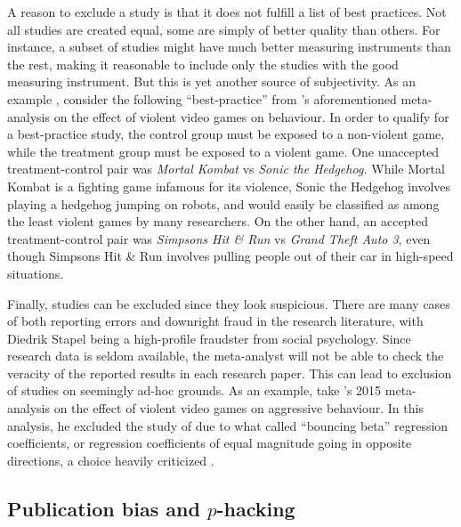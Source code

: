 A reason to exclude a study is that it does not fulfill a list of best practices. Not all studies are created equal, some are simply of better quality than others. For instance, a subset of studies might have much better measuring instruments than the rest, making it reasonable to include only the studies with the good measuring instrument. But this is yet another source of subjectivity. As an example \parencite[][p. 6]{lakens_reproducibility_2016}, consider the following ``best-practice'' from \textcite{Anderson2010-ki}'s aforementioned meta-analysis on the effect of violent video games  on behaviour. In order to qualify for a best-practice study, the control group must be exposed to a non-violent game, while the treatment group must be exposed to a violent game. One unaccepted treatment-control pair was \emph{Mortal Kombat} vs \emph{Sonic the Hedgehog.} While Mortal Kombat is a fighting game infamous for its violence, Sonic the Hedgehog involves playing a hedgehog jumping on robots, and would easily be classified as among the least violent games by many researchers. On the other hand, an accepted treatment-control pair was \emph{Simpsons Hit \& Run} vs \emph{Grand Theft Auto 3}, even though Simpsons Hit \& Run involves pulling people out of their car in high-speed situations. 

Finally, studies can be excluded since they look suspicious. There are many cases of both reporting errors \parencite{Nuijten2016-eu} and downright fraud in the research literature, with Diedrik Stapel being a high-profile fraudster from social psychology. Since research data is seldom available, the meta-analyst will not be able to check the veracity of the reported results in each research paper. This can lead to exclusion of studies on seemingly ad-hoc grounds. As an example, take \citeauthor{ferguson_angry_2015}'s 2015 meta-analysis on the effect of violent video games on aggressive behaviour. In this analysis, he excluded the study of \textcite{gentile_effects_2009} due to what \textcite{ferguson_angry_2015} called ``bouncing beta'' regression coefficients, or regression coefficients of equal magnitude going in opposite directions, a choice heavily criticized \textcite{gentile_what_2015}.

\subsection{Publication bias and $p$-hacking}

